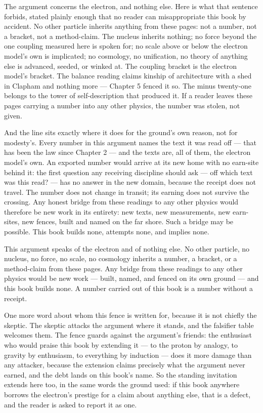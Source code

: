 The argument concerns the electron, and nothing else. Here is what that sentence
forbids, stated plainly enough that no reader can misappropriate this book by
accident. No other particle inherits anything from these pages: not a number, not
a bracket, not a method-claim. The nucleus inherits nothing; no force beyond the
one coupling measured here is spoken for; no scale above or below the electron
model's own is implicated; no cosmology, no unification, no theory of anything
else is advanced, seeded, or winked at. The coupling bracket is the electron
model's bracket. The balance reading claims kinship of architecture with a shed
in Clapham and nothing more --- Chapter 5 fenced it so. The minus twenty-one
belongs to the tower of self-description that produced it. If a reader leaves
these pages carrying a number into any other physics, the number was stolen, not
given.

And the line sits exactly where it does for the ground's own reason, not for
modesty's. Every number in this argument names the text it was read off --- that
has been the law since Chapter 2 --- and the texts are, all of them, the electron
model's own. An exported number would arrive at its new home with no earn-site
behind it: the first question any receiving discipline should ask --- off which
text was this read? --- has no answer in the new domain, because the receipt does
not travel. The number does not change in transit; its earning does not survive
the crossing. Any honest bridge from these readings to any other physics would
therefore be new work in its entirety: new texts, new measurements, new
earn-sites, new fences, built and named on the far shore. Such a bridge may be
possible. This book builds none, attempts none, and implies none.

\begin{fence}
This argument speaks of the electron and of nothing else. No other particle, no
nucleus, no force, no scale, no cosmology inherits a number, a bracket, or a
method-claim from these pages. Any bridge from these readings to any other
physics would be new work --- built, named, and fenced on its own ground --- and
this book builds none. A number carried out of this book is a number without a
receipt.
\end{fence}

One more word about whom this fence is written for, because it is not chiefly the
skeptic. The skeptic attacks the argument where it stands, and the falsifier
table welcomes them. The fence guards against the argument's friends: the
enthusiast who would praise this book by extending it --- to the proton by
analogy, to gravity by enthusiasm, to everything by induction --- does it more
damage than any attacker, because the extension claims precisely what the
argument never earned, and the debt lands on this book's name. So the standing
invitation extends here too, in the same words the ground used: if this book
anywhere borrows the electron's prestige for a claim about anything else, that
is a defect, and the reader is asked to report it as one.

